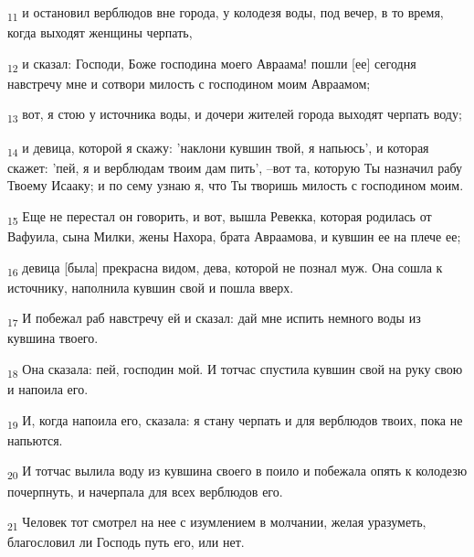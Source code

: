 \begin{tcolorbox}
\textsubscript{11} и остановил верблюдов вне города, у колодезя воды, под вечер, в то время, когда выходят женщины черпать,
\end{tcolorbox}
\begin{tcolorbox}
\textsubscript{12} и сказал: Господи, Боже господина моего Авраама! пошли [ее] сегодня навстречу мне и сотвори милость с господином моим Авраамом;
\end{tcolorbox}
\begin{tcolorbox}
\textsubscript{13} вот, я стою у источника воды, и дочери жителей города выходят черпать воду;
\end{tcolorbox}
\begin{tcolorbox}
\textsubscript{14} и девица, которой я скажу: 'наклони кувшин твой, я напьюсь', и которая скажет: 'пей, я и верблюдам твоим дам пить', --вот та, которую Ты назначил рабу Твоему Исааку; и по сему узнаю я, что Ты творишь милость с господином моим.
\end{tcolorbox}
\begin{tcolorbox}
\textsubscript{15} Еще не перестал он говорить, и вот, вышла Ревекка, которая родилась от Вафуила, сына Милки, жены Нахора, брата Авраамова, и кувшин ее на плече ее;
\end{tcolorbox}
\begin{tcolorbox}
\textsubscript{16} девица [была] прекрасна видом, дева, которой не познал муж. Она сошла к источнику, наполнила кувшин свой и пошла вверх.
\end{tcolorbox}
\begin{tcolorbox}
\textsubscript{17} И побежал раб навстречу ей и сказал: дай мне испить немного воды из кувшина твоего.
\end{tcolorbox}
\begin{tcolorbox}
\textsubscript{18} Она сказала: пей, господин мой. И тотчас спустила кувшин свой на руку свою и напоила его.
\end{tcolorbox}
\begin{tcolorbox}
\textsubscript{19} И, когда напоила его, сказала: я стану черпать и для верблюдов твоих, пока не напьются.
\end{tcolorbox}
\begin{tcolorbox}
\textsubscript{20} И тотчас вылила воду из кувшина своего в поило и побежала опять к колодезю почерпнуть, и начерпала для всех верблюдов его.
\end{tcolorbox}
\begin{tcolorbox}
\textsubscript{21} Человек тот смотрел на нее с изумлением в молчании, желая уразуметь, благословил ли Господь путь его, или нет.
\end{tcolorbox}
